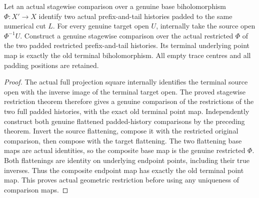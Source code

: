 \begin{theorem}
\label{hir:sharp-actual-padded-comparison-open-restriction}
\leanok
Let an actual stagewise comparison over a genuine base biholomorphism
$\Phi:X'\to X$ identify two actual prefix-and-tail histories padded to the
same numerical cut $L$. For every genuine target open $U$, internally take
the source open $\Phi^{-1}U$. Construct a genuine stagewise comparison over
the actual restricted $\Phi$ of the two padded restricted prefix-and-tail
histories. Its terminal underlying point map is exactly the old terminal
biholomorphism. All empty trace centres and all padding positions are retained.
\end{theorem}
\begin{proof}
The actual full projection square internally identifies the terminal source
open with the inverse image of the terminal target open. The proved stagewise
restriction theorem therefore gives a genuine comparison of the restrictions
of the two full padded histories, with the exact old terminal point map.
Independently construct both genuine flattened padded-history comparisons by
the preceding theorem. Invert the source flattening, compose it with the
restricted original comparison, then compose with the target flattening.
The two flattening base maps are actual identities, so the composite base map
is the genuine restricted $\Phi$. Both flattenings are identity on underlying
endpoint points, including their true inverses. Thus the composite endpoint
map has exactly the old terminal point map. This proves actual geometric
restriction before using any uniqueness of comparison maps.
\end{proof}

